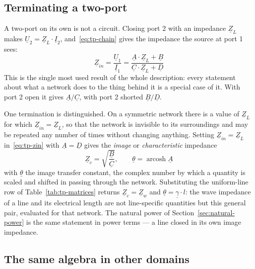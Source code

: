 \subsection{Terminating a two-port}
\label{sec:tp-terminated}

A two-port on its own is not a circuit. Closing port 2 with an impedance
$\underline{Z}_L$ makes $\underline{U}_2 = \underline{Z}_L \cdot
\underline{I}_2$, and~\eqref{eq:tp-chain} gives the impedance the source at
port 1 sees:
\begin{equation}
  \underline{Z}_{in}
    = \frac{\underline{U}_1}{\underline{I}_1}
    = \frac{\underline{A} \cdot \underline{Z}_L + \underline{B}}
           {\underline{C} \cdot \underline{Z}_L + \underline{D}}
  \label{eq:tp-zin}
\end{equation}
This is the single most used result of the whole description: every
statement about what a network does to the thing behind it is a special case
of it. With port 2 open it gives $\underline{A}/\underline{C}$, with port 2
shorted $\underline{B}/\underline{D}$.

One termination is distinguished. On a symmetric network there is a value of
$\underline{Z}_L$ for which $\underline{Z}_{in} = \underline{Z}_L$, so that
the network is invisible to its surroundings and may be repeated any number
of times without changing anything. Setting $\underline{Z}_{in} =
\underline{Z}_L$ in~\eqref{eq:tp-zin} with $\underline{A} = \underline{D}$
gives the \emph{image} or \emph{characteristic} impedance
\begin{equation}
  \underline{Z}_c = \sqrt{\frac{\underline{B}}{\underline{C}}},
  \qquad
  \underline{\theta} = \operatorname{arcosh} \underline{A}
  \label{eq:tp-image}
\end{equation}
with $\underline{\theta}$ the image transfer constant, the complex number by
which a quantity is scaled and shifted in passing through the network.
Substituting the uniform-line row of Table~\ref{tab:tp-matrices} returns
$\underline{Z}_c = \underline{Z}_w$ and $\underline{\theta} =
\underline{\gamma} \cdot l$: the wave impedance of a line and its electrical
length are not line-specific quantities but this general pair, evaluated for
that network. The natural power of Section~\ref{sec:natural-power} is the
same statement in power terms --- a line closed in its own image impedance.

\subsection{The same algebra in other domains}
\label{sec:tp-domains}


